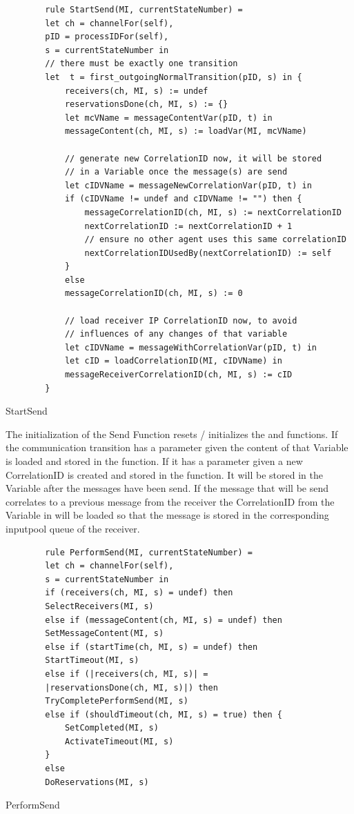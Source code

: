 \begin{listing}[H]
	\begin{verbatim}
		rule StartSend(MI, currentStateNumber) =
		let ch = channelFor(self),
		pID = processIDFor(self),
		s = currentStateNumber in
		// there must be exactly one transition
		let  t = first_outgoingNormalTransition(pID, s) in {
			receivers(ch, MI, s) := undef
			reservationsDone(ch, MI, s) := {}
			let mcVName = messageContentVar(pID, t) in
			messageContent(ch, MI, s) := loadVar(MI, mcVName)
			
			// generate new CorrelationID now, it will be stored
			// in a Variable once the message(s) are send
			let cIDVName = messageNewCorrelationVar(pID, t) in
			if (cIDVName != undef and cIDVName != "") then {
				messageCorrelationID(ch, MI, s) := nextCorrelationID
				nextCorrelationID := nextCorrelationID + 1
				// ensure no other agent uses this same correlationID
				nextCorrelationIDUsedBy(nextCorrelationID) := self
			}
			else
			messageCorrelationID(ch, MI, s) := 0
			
			// load receiver IP CorrelationID now, to avoid
			// influences of any changes of that variable
			let cIDVName = messageWithCorrelationVar(pID, t) in
			let cID = loadCorrelationID(MI, cIDVName) in
			messageReceiverCorrelationID(ch, MI, s) := cID
		}
	\end{verbatim}
	\caption{StartSend}
	\label{lst:shortasm:StartSend}
\end{listing}


The initialization of the Send Function resets / initializes the  and
 functions.
If the communication transition has a  parameter given the
content of that Variable is loaded and stored in the 
function. If it has a  parameter given
a new CorrelationID is created and stored in the  function.
It will be stored in the Variable after the messages have been send.
If the message that will be send correlates to a previous message from the receiver
the CorrelationID from the Variable in  will be loaded
so that the message is stored in the corresponding inputpool queue of the receiver.


\begin{listing}[H]
	\begin{verbatim}
		rule PerformSend(MI, currentStateNumber) =
		let ch = channelFor(self),
		s = currentStateNumber in
		if (receivers(ch, MI, s) = undef) then
		SelectReceivers(MI, s)
		else if (messageContent(ch, MI, s) = undef) then
		SetMessageContent(MI, s)
		else if (startTime(ch, MI, s) = undef) then
		StartTimeout(MI, s)
		else if (|receivers(ch, MI, s)| =
		|reservationsDone(ch, MI, s)|) then
		TryCompletePerformSend(MI, s)
		else if (shouldTimeout(ch, MI, s) = true) then {
			SetCompleted(MI, s)
			ActivateTimeout(MI, s)
		}
		else
		DoReservations(MI, s)
	\end{verbatim}
	\caption{PerformSend}
	\label{lst:shortasm:PerformSend}
\end{listing}


